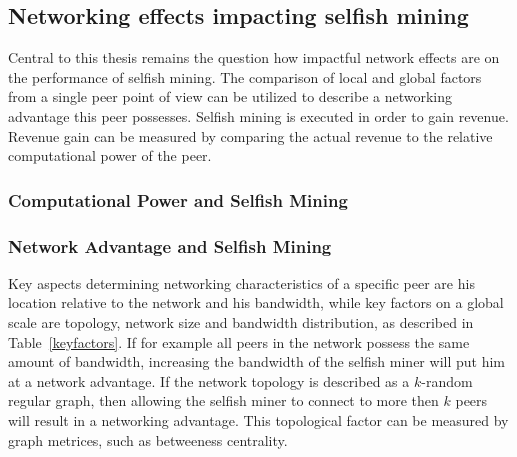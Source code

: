 \subsection{Networking effects impacting selfish mining}
Central to this thesis remains the question how impactful network effects are on the performance of selfish mining. The comparison of local and global factors from a single peer point of view can be utilized to describe a networking advantage this peer possesses.
Selfish mining is executed in order to gain revenue. Revenue gain can be measured by comparing the actual revenue to the relative computational power of the peer.
\subsubsection{Computational Power and Selfish Mining}


\subsubsection{Network Advantage and Selfish Mining}
Key aspects determining networking characteristics of a specific peer are his location relative to the network and his bandwidth, while key factors on a global scale are topology, network size and bandwidth distribution, as described in Table~\ref{keyfactors}. If for example all peers in the network possess the same amount of bandwidth, increasing the bandwidth of the selfish miner will put him at a network advantage.
If the network topology is described as a $k$-random regular graph, then allowing the selfish miner to connect to more then $k$ peers will result in a networking advantage. This topological factor can be measured by graph metrices, such as betweeness centrality.

